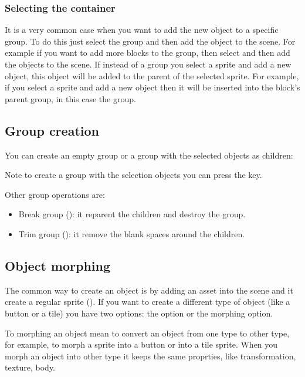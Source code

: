 \documentclass[letterpaper,10pt,english]{sphinxmanual}
\begin{document}
\subsubsection{Selecting the container}
\label{\detokenize{canvas:selecting-the-container}}
It is a very common case when you want to add the new object to a specific group. To do this just select the group and then add the object to the scene. For example if you want to add more blocks to the  group, then select  and then add the objects to the scene. If instead of a group you select a sprite and add a new object, this object will be added to the parent of the selected sprite. For example, if you select a  sprite and add a new object then it will be inserted into the block’s parent group, in this case the  group.


\subsection{Group creation}
\label{\detokenize{canvas:group-creation}}
You can create an empty group or a group with the selected objects as children:

\noindent{}

Note to create a group with the selection objects you can press the  key.

Other group operations are:
\begin{itemize}
\item {} 
Break group (): it reparent the children and destroy the group.

\item {} 
Trim group (): it remove the blank spaces around the children.

\end{itemize}


\subsection{Object morphing}
\label{\detokenize{canvas:object-morphing}}
The common way to create an object is by adding an asset into the scene and it create a regular sprite (). If you want to create a different type of object (like a button or a tile) you have two options: the  option or the morphing option.

To morphing an object mean to convert an object from one type to other type, for example, to morph a sprite into a button or into a tile sprite. When you morph an object into other type it keeps the same proprties, like transformation, texture, body.
\end{document}

